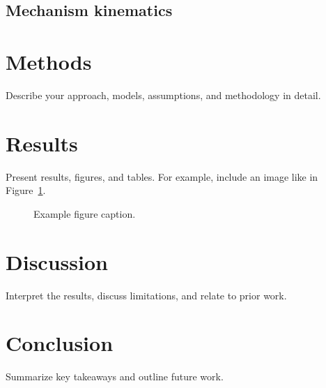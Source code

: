 \documentclass[11pt]{article}
\begin{document}
\subsection{Mechanism kinematics}

\section{Methods}
Describe your approach, models, assumptions, and methodology in detail.

\section{Results}
Present results, figures, and tables. For example, include an image like in Figure~\ref{fig:example}.

\begin{figure}[h]
  \centering
  \caption{Example figure caption.}
  \label{fig:example}
\end{figure}

\section{Discussion}
Interpret the results, discuss limitations, and relate to prior work.

\section{Conclusion}
Summarize key takeaways and outline future work.

% 
% 
\end{document}
